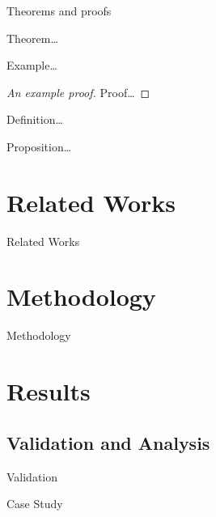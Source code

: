 \documentclass[
  xcolor={hyperref,svgnames,x11names,table},
  hyperref={pdfencoding=unicode,plainpages=false,pdfpagelabels=true,breaklinks=true},
  brazilian,english,12pt,aspectratio=149,
]{beamer}
\begin{document}
\begin{frame}{Theorems and proofs}
  \pause
  \begin{theorem}
    Theorem\dots
  \end{theorem}

  \pause
  \begin{example}
    Example\dots
  \end{example}

  \pause
  \begin{proof}[An example proof]
    Proof\dots
  \end{proof}

  \pause
  \begin{definition}
    Definition\dots
  \end{definition}

  \pause
  \begin{proposition}
    Proposition\dots
  \end{proposition}
\end{frame}

\section{Related Works}

\begin{frame}{Related Works}
\end{frame}

\section{Methodology}

\begin{frame}{Methodology}
\end{frame}

\section{Results}

\subsection{Validation and Analysis}

\begin{frame}{Validation}
\end{frame}

\begin{frame}{Case Study}
\end{frame}
\end{document}
